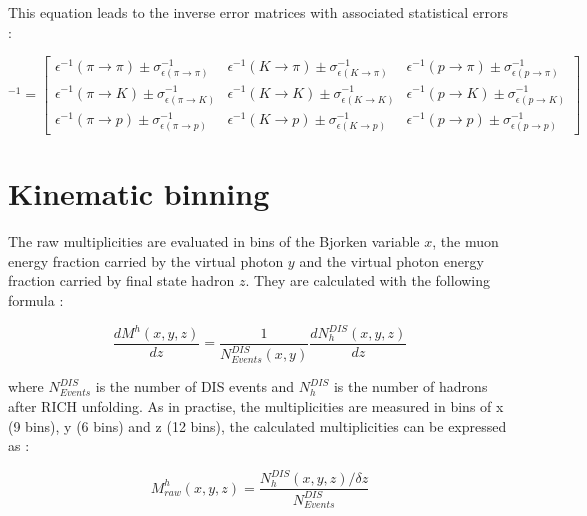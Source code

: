 This equation leads to the inverse error matrices with associated statistical errors :

\begin{equation}
[M^{\pm}_{RICH}]^{-1}
=
\begin{bmatrix}
\epsilon^{-1}(\pi \rightarrow \pi)\pm\sigma^{-1}_{\epsilon(\pi \rightarrow \pi)} & \epsilon^{-1}(K \rightarrow \pi)\pm\sigma^{-1}_{\epsilon(K \rightarrow \pi)} & \epsilon^{-1}(p \rightarrow \pi)\pm\sigma^{-1}_{\epsilon(p \rightarrow \pi)}\\
\epsilon^{-1}(\pi \rightarrow K)\pm\sigma^{-1}_{\epsilon(\pi \rightarrow K)} & \epsilon^{-1}(K \rightarrow K)\pm\sigma^{-1}_{\epsilon(K \rightarrow K)} & \epsilon^{-1}(p \rightarrow K)\pm\sigma^{-1}_{\epsilon(p \rightarrow K)} \\
\epsilon^{-1}(\pi \rightarrow p)\pm\sigma^{-1}_{\epsilon(\pi \rightarrow p)} & \epsilon^{-1}(K \rightarrow p)\pm\sigma^{-1}_{\epsilon(K \rightarrow p)} & \epsilon^{-1}(p \rightarrow p)\pm\sigma^{-1}_{\epsilon(p \rightarrow p)}
\end{bmatrix}
\end{equation}


\section{Kinematic binning}

The raw multiplicities are evaluated in bins of the Bjorken variable $x$, the muon energy fraction carried
by the virtual photon $y$ and the virtual photon energy fraction carried by final state hadron $z$. They
are calculated with the following formula :

\begin{equation}
  \frac{dM^h(x,y,z)}{dz}=\frac{1}{N^{DIS}_{Events}(x,y)}\frac{dN^{DIS}_{h}(x,y,z)}{dz}
\end{equation}

where $N^{DIS}_{Events}$ is the number of DIS events and $N^{DIS}_{h}$ is the number of
hadrons after RICH unfolding. As in practise, the multiplicities are measured in bins of
x (9 bins), y (6 bins) and z (12 bins), the calculated multiplicities can be expressed as :

\begin{equation}
  M^h_{raw}(x,y,z) = \frac{N^{DIS}_{h}(x,y,z)/\delta z}{N^{DIS}_{Events}}
\end{equation}

